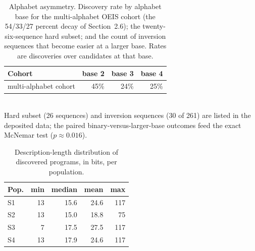 \begin{table}[!ht]\centering
\caption{Alphabet asymmetry. Discovery rate by alphabet base for the multi-alphabet OEIS cohort (the 54/33/27 percent decay of Section~2.6); the twenty-six-sequence hard subset; and the count of inversion sequences that become easier at a larger base. Rates are discoveries over candidates at that base.}\label{tab:sc3}
\begin{tabular}{lrrr}\toprule
Cohort & base 2 & base 3 & base 4 \\\midrule
multi-alphabet cohort & 45\% & 24\% & 25\% \\
\bottomrule\end{tabular}
\\[2pt]\footnotesize Hard subset (26 sequences) and inversion sequences (30 of 261) are listed in the deposited data; the paired binary-versus-larger-base outcomes feed the exact McNemar test ($p\approx0.016$).
\end{table}

\begin{table}[!ht]\centering
\caption{Description-length distribution of discovered programs, in bits, per population.}\label{tab:sc4}
\begin{tabular}{lrrrr}\toprule
Pop. & min & median & mean & max \\\midrule
S1 & 13 & 15.6 & 24.6 & 117 \\
S2 & 13 & 15.0 & 18.8 & 75 \\
S3 & 7 & 17.5 & 27.5 & 117 \\
S4 & 13 & 17.9 & 24.6 & 117 \\
\bottomrule\end{tabular}\end{table}

